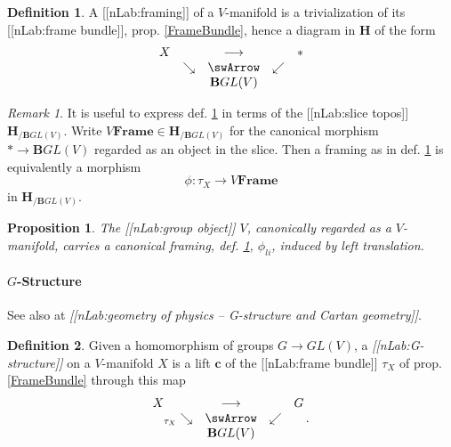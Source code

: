 \documentclass[12pt,titlepage]{article}
\def\mathllap{\mathpalette\mathllapinternal}
\def\mathllapinternal#1#2{\llap{$\mathsurround=0pt#1{#2}$}}
\newcommand{\itexarray}[1]{\begin{matrix}#1\end{matrix}}
\theoremstyle{plain}
\newtheorem{prop}{Proposition}
\theoremstyle{definition}
\newtheorem{defn}{Definition}
\theoremstyle{remark}
\newtheorem{remark}{Remark}
\begin{document}
\begin{defn}
\label{Framing}\hypertarget{Framing}{}
A [[nLab:framing]] of a $V$-manifold is a trivialization of its [[nLab:frame bundle]], prop. \ref{FrameBundle}, hence a diagram in $\mathbf{H}$ of the form
\begin{displaymath}
\itexarray{
    X && \longrightarrow && \ast
    \\
    & \searrow &\swArrow& \swarrow
    \\
    && \mathbf{B}GL(V)
  }
\end{displaymath}
\end{defn}
\begin{remark}
\label{ModuliForFramings}\hypertarget{ModuliForFramings}{}
It is useful to express def. \ref{Framing} in terms of the [[nLab:slice topos]] $\mathbf{H}_{/\mathbf{B}GL(V)}$. Write $V\mathbf{Frame}\in \mathbf{H}_{/\mathbf{B}GL(V)}$ for the canonical morphism $\ast \to \mathbf{B}GL(V)$ regarded as an object in the slice. Then a framing as in def. \ref{Framing} is equivalently a morphism
\begin{displaymath}
\phi \colon \tau_X \longrightarrow V\mathbf{Frame}
\end{displaymath}
in $\mathbf{H}_{/\mathbf{B}GL(V)}$.
\end{remark}
\begin{prop}
\label{LeftTranslationFraming}\hypertarget{LeftTranslationFraming}{}
The [[nLab:group object]] $V$, canonically regarded as a $V$-manifold, carries a canonical framing, def. \ref{Framing}, $\phi_{li}$, induced by left translation.
\end{prop}
\hypertarget{GStructure}{}\paragraph*{{$G$-Structure}}\label{GStructure}
See also at \emph{[[nLab:geometry of physics -- G-structure and Cartan geometry]]}.
\begin{defn}
\label{GStructure}\hypertarget{GStructure}{}
Given a homomorphism of groups $G \longrightarrow GL(V)$, a \emph{[[nLab:G-structure]]} on a $V$-manifold $X$ is a lift $\mathbf{c}$ of the [[nLab:frame bundle]] $\tau_X$ of prop. \ref{FrameBundle} through this map
\begin{displaymath}
\itexarray{
    X && \stackrel{}{\longrightarrow} && G
    \\
    & {}_{\mathllap{\tau_X}}\searrow &\swArrow& \swarrow
    \\
    && \mathbf{B}GL(V)
  }
  \,.
\end{displaymath}
\end{defn}
\end{document}
